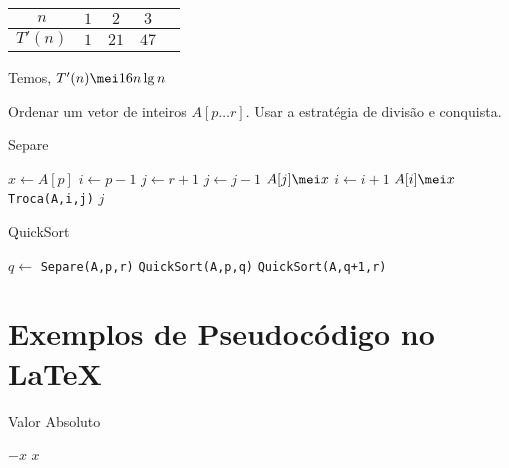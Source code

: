 \documentclass[a4paper]{memoir}
\begin{document}
\begin{sol}
\begin{center}
\begin{tabular}{|c*{4}{|c}}
\hline
$n$ & $1$ & $2$ & $3$\\ \hline
$T'(n)$ & $1$ & $21$ & $47$\\ \hline
\end{tabular}
\end{center}

Temos, $T'(n) \mei 16 n \lg n$
\end{sol}

\begin{ex}
Ordenar um vetor de inteiros $A[p \ldots r]$. Usar a estratégia de divisão e conquista.
\end{ex}

\begin{sol}

\begin{algorithm}
\caption*{Separe}
\begin{algorithmic}[1]
		
  \State $x \gets A[p]$
  \State $i \gets p - 1$
  \State $j \gets r + 1$
    \Repeat
      \State $j \gets j - 1$
    \Until $A[j] \mei x$
    \Repeat
      \State $i \gets i + 1$
    \Until $A[i] \mei x$
      \State \texttt{Troca(A,i,j)}
    \Else
      \State \Return $j$
    \EndIf
  \EndWhile
\EndFunction
\end{algorithmic}
\end{algorithm}

\begin{algorithm}
\caption*{QuickSort}
\begin{algorithmic}[1]
    \State $q \gets$ \texttt{Separe(A,p,r)}
    \State \texttt{QuickSort(A,p,q)}
    \State \texttt{QuickSort(A,q+1,r)}
  \EndIf
\EndFunction
\end{algorithmic}
\end{algorithm}

\end{sol}

\chapter*{Exemplos de Pseudocódigo no \LaTeX}

\begin{algorithm}
\caption*{Valor Absoluto}
\begin{algorithmic}[1]
    \State \Return $-x$
\Else
    \State \Return $x$
\EndIf
\EndFunction
\end{algorithmic}
\end{algorithm}
\end{document}
